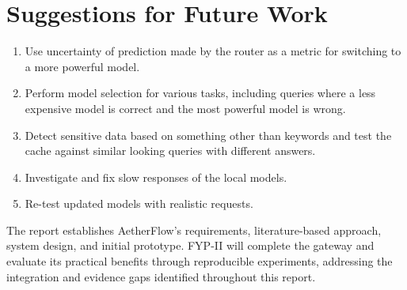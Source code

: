 \section{Suggestions for Future Work}
\begin{enumerate}
\setlength{\itemsep}{0pt}
\setlength{\parsep}{0pt}
\item Use uncertainty of prediction made by the router as a metric for switching to a more powerful model.
\item Perform model selection for various tasks, including queries where a less expensive model is correct and the most powerful model is wrong.
\item Detect sensitive data based on something other than keywords and test the cache against similar looking queries with different answers.
\item Investigate and fix slow responses of the local models.
\item Re-test updated models with realistic requests.
\end{enumerate}

The report establishes AetherFlow's requirements, literature-based approach, system design, and initial prototype. FYP-II will complete the gateway and evaluate its practical benefits through reproducible experiments, addressing the integration and evidence gaps identified throughout this report.
